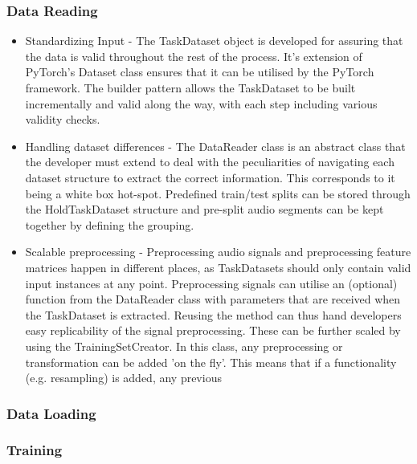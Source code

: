 \subsubsection{Data Reading}
\begin{itemize}
	\item Standardizing Input - The TaskDataset object is developed for assuring that the data is valid throughout the rest of the process. It's extension of PyTorch's Dataset class ensures that it can be utilised by the PyTorch framework. The builder pattern allows the TaskDataset to be built incrementally and valid along the way, with each step including various validity checks.
	\item Handling dataset differences - The DataReader class is an abstract class that the developer must extend to deal with the peculiarities of navigating each dataset structure to extract the correct information. This corresponds to it being a white box hot-spot. Predefined train/test splits can be stored through the HoldTaskDataset structure and pre-split audio segments can be kept together by defining the grouping. 
	\item Scalable preprocessing - Preprocessing audio signals and preprocessing feature matrices happen in different places, as TaskDatasets should only contain valid input instances at any point. Preprocessing signals can utilise an (optional) function from the DataReader class with parameters that are received when the TaskDataset is extracted. Reusing the method can thus hand developers easy replicability of the signal preprocessing. These can be further scaled by using the TrainingSetCreator. In this class, any preprocessing or transformation can be added 'on the fly'. This means that if a functionality (e.g. resampling) is added, any previous 
\end{itemize}
\subsubsection{Data Loading}
\subsubsection{Training}